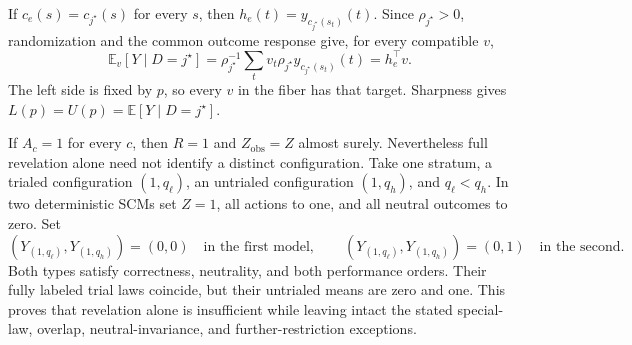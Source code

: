 If \(c_e(s)=c_{j^\star}(s)\) for every \(s\), then \(h_e(t)=y_{c_{j^\star}(s_t)}(t)\).  Since \(\rho_{j^\star}>0\), randomization and the common outcome response give, for every compatible \(v\),
\[
\mathbb E_v[Y\mid D=j^\star]
=\rho_{j^\star}^{-1}\sum_tv_t\rho_{j^\star}y_{c_{j^\star}(s_t)}(t)
=h_e^{\top}v.
\]
The left side is fixed by \(p\), so every \(v\) in the fiber has that target.  Sharpness gives \(L(p)=U(p)=\mathbb E[Y\mid D=j^\star]\).

If \(A_c=1\) for every \(c\), then \(R=1\) and \(Z_{\mathrm{obs}}=Z\) almost surely.  Nevertheless full revelation alone need not identify a distinct configuration.  Take one stratum, a trialed configuration \((1,q_\ell)\), an untrialed configuration \((1,q_h)\), and \(q_\ell<q_h\).  In two deterministic SCMs set \(Z=1\), all actions to one, and all neutral outcomes to zero.  Set
\[
(Y_{(1,q_\ell)},Y_{(1,q_h)})=(0,0)
\quad\text{in the first model},\qquad
(Y_{(1,q_\ell)},Y_{(1,q_h)})=(0,1)
\quad\text{in the second}.
\]
Both types satisfy correctness, neutrality, and both performance orders.  Their fully labeled trial laws coincide, but their untrialed means are zero and one.  This proves that revelation alone is insufficient while leaving intact the stated special-law, overlap, neutral-invariance, and further-restriction exceptions.